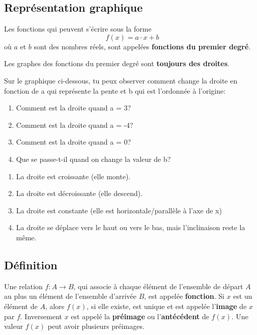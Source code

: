 \documentclass[a4paper,11pt]{article}
\begin{document}
\subsection{Représentation graphique}
Les fonctions qui peuvent s'écrire sous la forme
$$f(x)=a\cdot x +b$$
où $a$ et $b$ sont des nombres réels, sont appelées \textbf{fonctions du premier degré}.

Les graphes des fonctions du premier degré sont \textbf{toujours des droites}.

Sur le graphique ci-dessous, tu peux observer comment change la droite en fonction de a qui représente la pente et b qui est l'ordonnée à l'origine:\par
{} %
\begin{enumerate}
    \item Comment est la droite quand a = 3?
    \item Comment est la droite quand a = -4?
    \item Comment est la droite quand a = 0?
    \item Que se passe-t-il quand on change la valeur de b?
\end{enumerate}

\begin{solution}
\begin{enumerate}
    \item La droite est croissante (elle monte).
    \item La droite est décroissante (elle descend).
    \item La droite est constante (elle est horizontale/parallèle à l'axe de x)
    \item La droite se déplace vers le haut ou vers le bas, mais l'inclinaison reste la même.
\end{enumerate}
\end{solution}

\subsection{Définition}
Une relation $f: A \longrightarrow B$, qui associe à chaque élément de l'ensemble de départ $A$ au plus un élément de l'ensemble d'arrivée $B$, est appelée \textbf{fonction}.
Si $x$ est un élément de $A$, alors $f(x)$, si elle existe, est unique et est appelée l'\textbf{image} de $x$ par $f$.
Inversement $x$ est appelé la \textbf{préimage} ou l'\textbf{antécédent} de $f(x)$.
Une valeur $f(x)$ peut avoir plusieurs préimages.
\end{document}
